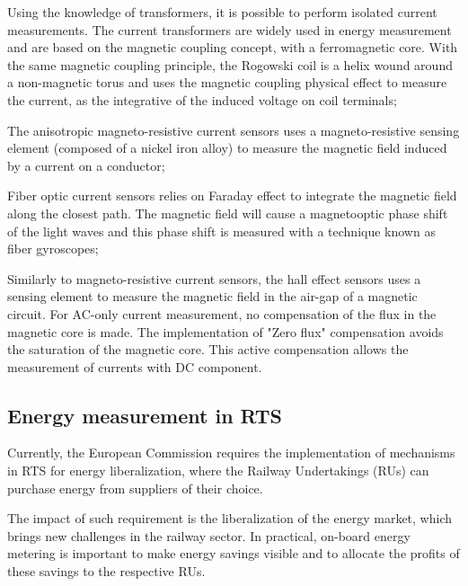 	\begin{description}
		\setlength\itemsep{-0em}
		\item [Magnetic coupling] Using the knowledge of transformers, it is possible to perform isolated current measurements. The current transformers are widely used in energy measurement and are based on the magnetic coupling concept, with a ferromagnetic core. With the same magnetic coupling principle, the Rogowski coil is a helix wound around a non-magnetic torus and uses the magnetic coupling physical effect to measure the current, as the integrative of the induced voltage on coil terminals;
		\item [Magneto resistance] The anisotropic magneto-resistive current sensors uses a magneto-resistive sensing element (composed of a nickel iron alloy) to measure the magnetic field induced by a current on a conductor;
		\item [Faraday induction] Fiber optic current sensors relies on Faraday effect to integrate the magnetic field along the closest path. The magnetic field will cause a magnetooptic phase shift of the light waves and this phase shift is measured with a technique known as fiber gyroscopes;
		\item [Hall Effect] Similarly to magneto-resistive current sensors, the hall effect sensors uses a sensing element to measure the magnetic field in the air-gap of a magnetic circuit. For AC-only current measurement, no compensation of the flux in the magnetic core is made. The implementation of "Zero flux" compensation avoids the saturation of the magnetic core. This active compensation allows the measurement of currents with DC component.
		
	\end{description}
	

\subsection{Energy measurement in RTS}	
\label{subs:323}

	Currently, the European Commission requires the implementation of mechanisms in RTS for energy liberalization, where the Railway Undertakings (RUs) can purchase energy from suppliers of their choice.
	
	The impact of such requirement is the liberalization of the energy market, which brings new challenges in the railway sector. In practical, on-board energy metering is important to make energy savings visible and to allocate the profits of these savings to the respective RUs.
	
